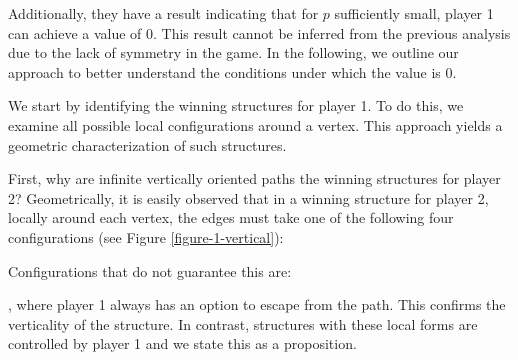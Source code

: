         Additionally, they have a result indicating that for $p$ sufficiently small, player 1 can achieve a value of 0. This result cannot be inferred from the previous analysis due to the lack of symmetry in the game. In the following, we outline our approach to better understand the conditions under which the value is 0.

        We start by identifying the winning structures for player 1. To do this, we examine all possible local configurations around a vertex. This approach yields a geometric characterization of such structures.

        First, why are infinite vertically oriented paths the winning structures for player 2? Geometrically, it is easily observed that in a winning structure for player 2, locally around each vertex, the edges must take one of the following four configurations (see Figure \ref{figure-1-vertical}):

        \begin{center}
        \end{center}
       \noindent Configurations that do not guarantee this are:
            ,
            where player 1 always has an option to escape from the path. This confirms the verticality of the structure. In contrast, structures with these local forms are controlled by player 1 and we state this as a proposition.

